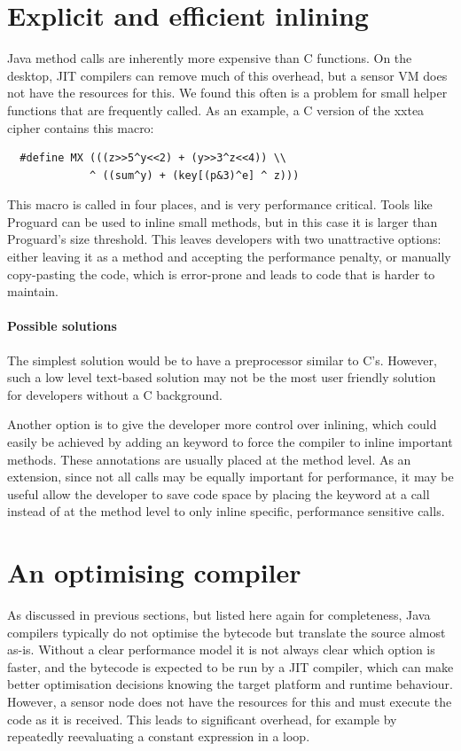 \section{Explicit and efficient inlining}
\label{sec-inlining}
Java method calls are inherently more expensive than C functions. On the desktop, JIT compilers can remove much of this overhead, but a sensor VM does not have the resources for this. We found this often is a problem for small helper functions that are frequently called. As an example, a C version of the xxtea cipher \cite{Wheeler:1998} contains this macro: 
\begin{verbatim}
  #define MX (((z>>5^y<<2) + (y>>3^z<<4)) \\
             ^ ((sum^y) + (key[(p&3)^e] ^ z)))
\end{verbatim}

This macro is called in four places, and is very performance critical. Tools like Proguard \cite{proguard} can be used to inline small methods, but in this case it is larger than Proguard's size threshold. This leaves developers with two unattractive options: either leaving it as a method and accepting the performance penalty, or manually copy-pasting the code, which is error-prone and leads to code that is harder to maintain.

\paragraph{Possible solutions}
The simplest solution would be to have a preprocessor similar to C's. However, such a low level text-based solution may not be the most user friendly solution for developers without a C background.

Another option is to give the developer more control over inlining, which could easily be achieved by adding an  keyword to force the compiler to inline important methods. These annotations are usually placed at the method level. As an extension, since not all calls may be equally important for performance, it may be useful allow the developer to save code space by placing the  keyword at a call instead of at the method level to only inline specific, performance sensitive calls.




\section{An optimising compiler}
\label{sec-optimising-javac}
As discussed in previous sections, but listed here again for completeness, Java compilers typically do not optimise the bytecode but translate the source almost as-is. Without a clear performance model it is not always clear which option is faster, and the bytecode is expected to be run by a JIT compiler, which can make better optimisation decisions knowing the target platform and runtime behaviour. However, a sensor node does not have the resources for this and must execute the code as it is received. This leads to significant overhead, for example by repeatedly reevaluating a constant expression in a loop.

